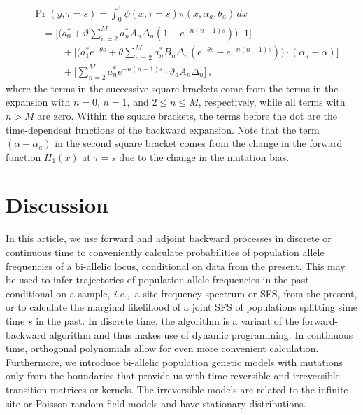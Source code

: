 \documentclass[preprint]{elsarticle}
\newcommand\ie{{\it i.e.,}}
\begin{document}
\begin{equation}
\begin{split}
    &\Pr(y,\tau=s)=\int_0^1 \psi(x,\tau=s)\pi(x,\alpha_a,\theta_a)\,dx\\
    &\quad=\bigg[\bigg(a_0^{*}+\vartheta\sum_{n=2}^M a_n^{*}A_n\Delta_n  (1-e^{-n(n-1)s})\bigg)\cdot 1\bigg]\\ &\quad\qquad+\bigg[\bigg(a_1^{*} e^{-\theta s}+\theta\sum_{n=2}^M a_n^{*}B_n\Delta_n(e^{-\theta s}- e^{-n(n-1)s})\bigg)\cdot (\alpha_a-\alpha)\bigg]\\
    &\quad\qquad+\bigg[\sum_{n=2}^M a_n^{*} e^{-n(n-1)s}\cdot \vartheta_a A_n\Delta_n\bigg]\,,
\end{split}
\end{equation}
where the terms in the successive square brackets come from the terms in the expansion with $n=0$, $n=1$, and $2\leq n\leq M$, respectively, while all terms with $n>M$ are zero. Within the square brackets, the terms before the dot are the time-dependent functions of the backward expansion. Note that the term $(\alpha-\alpha_a)$ in the second square bracket comes from the change in the forward function $H_1(x)$ at $\tau=s$  due to the change in the mutation bias. 

\section{Discussion}

In this article, we use forward and adjoint backward processes in discrete or continuous time to conveniently calculate probabilities of population allele frequencies of a bi-allelic locus, conditional on data from the present. This may be used to infer trajectories of population allele frequencies in the past conditional on a sample, \ie\ a site frequency spectrum or SFS, from the present, or to calculate the marginal likelihood of a joint SFS of populations splitting sime time $s$ in the past. In discrete time, the algorithm is a variant of the forward-backward algorithm and thus makes use of dynamic programming. In continuous time, orthogonal polynomials allow for even more convenient calculation. Furthermore, we introduce bi-allelic population genetic models with mutations only from the boundaries that provide us with time-reversible and irreversible transition matrices or kernels. The irreversible models are related to the infinite site \citep{Kimu69,Evan07} or Poisson-random-field models \citep{Sawy92} and have stationary distributions.
\end{document}
